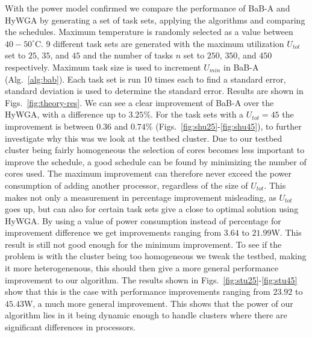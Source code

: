\documentclass[conference]{IEEEtran}
\begin{document}
With the power model confirmed we compare the performance of BaB-A and HyWGA by generating a set of task sets, applying the algorithms and comparing the schedules.
Maximum temperature is randomly selected as a value between $40-50^{\circ}$C. 9 different task sets are generated with the maximum utilization $U_{tot}$ set to $25$, $35$, and $45$ and the number of tasks $n$ set to $250$, $350$, and $450$ respectively.
Maximum task size is used to increment $U_{min}$ in BaB-A (Alg.~\ref{alg:bab}).
Each task set is run 10 times each to find a standard error, standard deviation is used to determine the standard error. Results are shown in Figs.~\ref{fig:theory-res}. We can see a clear improvement of BaB-A over the HyWGA, with a difference up to $3.25$\%. For the task sets with a $U_{tot} = 45$ the improvement is between $0.36$ and $0.74$\% (Figs.~\ref{fig:shu25}-\ref{fig:shu45}), to further investigate why this was we look at the testbed cluster.
Due to our testbed cluster being fairly homogeneous the selection of cores becomes less important to improve the schedule, a good schedule can be found by minimizing the number of cores used. The maximum improvement can therefore never exceed the power consumption of adding another processor, regardless of the size of $U_{tot}$. This makes not only a measurement in percentage improvement misleading, as $U_{tot}$ goes up, but can also for certain task sets give a close to optimal solution using HyWGA.
By using a value of power consumption instead of percentage for improvement difference we get improvements ranging from $3.64$ to $21.99$W. This result is still not good enough for the minimum improvement. To see if the problem is with the cluster being too homogeneous we tweak the testbed, making it more heterogenenous, this should then give a more general performance improvement to our algorithm. The results shown in Figs.~\ref{fig:stu25}-\ref{fig:stu45} show that this is the case with performance improvements ranging from $23.92$ to $45.43$W, a much more general improvement.
This shows that the power of our algorithm lies in it being dynamic enough to handle clusters where there are significant differences in processors.
\end{document}
